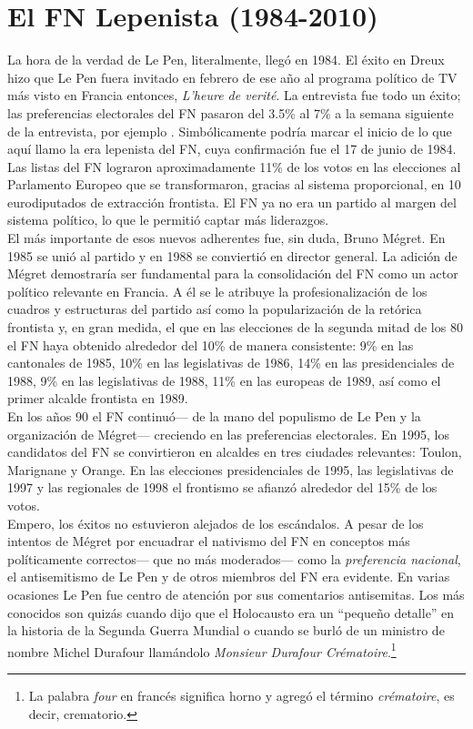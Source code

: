 \section{El FN Lepenista (1984-2010)}

La hora de la verdad de Le Pen, literalmente, llegó en 1984. El éxito en Dreux hizo que Le Pen fuera invitado en febrero de ese año al programa político de TV más visto en Francia entonces, \textit{L'heure de verité}. La entrevista fue todo un éxito; las preferencias electorales del FN pasaron del 3.5\% al 7\% a la semana siguiente de la entrevista, por ejemplo \parencite{Stockemer17}. Simbólicamente podría marcar el inicio de lo que aquí llamo la era lepenista del FN, cuya confirmación fue el 17 de junio de 1984. Las listas del FN lograron aproximadamente 11\% de los votos en las elecciones al Parlamento Europeo que se transformaron, gracias al sistema proporcional, en 10 eurodiputados de extracción frontista. El FN ya no era un partido al margen del sistema político, lo que le permitió captar más liderazgos.\\ 

El más importante de esos nuevos adherentes fue, sin duda, Bruno Mégret. En 1985 se unió al partido y en 1988 se conviertió en director general. La adición de Mégret demostraría ser fundamental para la consolidación del FN como un actor político relevante en Francia. A él se le atribuye la profesionalización de los cuadros y estructuras del partido así como la popularización de la retórica frontista y, en gran medida, el que en las elecciones de la segunda mitad de los 80 el FN haya obtenido alrededor del 10\% de manera consistente: 9\% en las cantonales de 1985, 10\% en las legislativas de 1986, 14\% en las presidenciales de 1988, 9\% en las legislativas de 1988, 11\% en las europeas de 1989, así como el primer alcalde frontista en 1989.\\ 

En los años 90 el FN continuó--- de la mano del populismo de Le Pen y la organización de Mégret--- creciendo en las preferencias electorales. En 1995, los candidatos del FN se convirtieron en alcaldes en tres ciudades relevantes: Toulon, Marignane y Orange. En las elecciones presidenciales de 1995, las legislativas de 1997 y las regionales de 1998 el frontismo se afianzó alrededor del 15\% de los votos.\\

Empero, los éxitos no estuvieron alejados de los escándalos. A pesar de los intentos de Mégret por encuadrar el nativismo del FN en conceptos más políticamente correctos--- que no más moderados--- como la \textit{preferencia nacional}, el antisemitismo de Le Pen y de otros miembros del FN era evidente. En varias ocasiones Le Pen fue centro de atención por sus comentarios antisemitas. Los más conocidos son quizás cuando dijo que el Holocausto era un ``pequeño detalle'' en la historia de la Segunda Guerra Mundial o cuando se burló de un ministro de nombre Michel Durafour llamándolo \textit{Monsieur Durafour Crématoire}.\footnote{La palabra \textit{four} en francés significa horno y agregó el término \textit{crématoire}, es decir, crematorio.}\\ 

